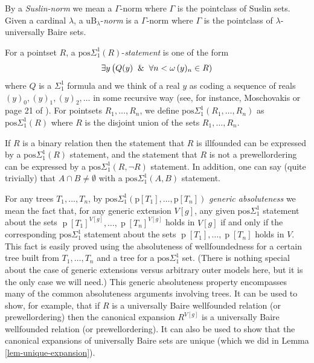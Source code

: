 \documentclass[fleqn, 11pt]{amsart}
\theoremstyle{plain}
\theoremstyle{definition}
\theoremstyle{remark}
\newcommand{\uB}{\mathrm{uB}}
\newcommand{\posSigmaoneone}{\mathrm{pos}\Sigma^1_1}
\DeclareMathOperator{\p}{p}
\begin{document}
By a \emph{Suslin-norm} we mean a $\Gamma$-norm where $\Gamma$ is the pointclass of Suslin sets. Given a cardinal $\lambda$, a $\uB_{\lambda}$-\emph{norm} is a $\Gamma$-norm where $\Gamma$ is the pointclass of $\lambda$-universally Baire sets.


For a pointset $R$, a $\posSigmaoneone(R)$-\emph{statement} 
is one of the form 
\[\exists y\,\big(Q(y) \And \forall n < \omega\, (y)_n \in R)\]
where $Q$ is a $\Sigma^1_1$ formula and we think of a real $y$ as coding a sequence of reals $(y)_0,(y)_1,(y)_2,\ldots$ in some recursive way (see, for instance, Moschovakis \cite[Lemma 7D.7]{MosDST2009} or page 21 of \cite{Larson:Extensions}).
For pointsets $R_1,\ldots,R_n$, we define $\posSigmaoneone(R_1,\ldots,R_n)$ as $\posSigmaoneone(R)$ where $R$ is the disjoint union of the sets $R_1,\ldots,R_n$.

If $R$ is a binary relation then the statement that $R$ is illfounded can be expressed by a $\posSigmaoneone(R)$ statement, and the statement that $R$ is not a prewellordering can be expressed by a  $\posSigmaoneone(R,\neg R)$ statement.
In addition, one can say (quite trivially) that $A \cap B \ne \emptyset$ with a $\posSigmaoneone(A,B)$ statement.

For any trees $T_1,\ldots,T_n$,
by $\posSigmaoneone(\text{p}[T_1],\ldots,\text{p}[T_n])$ \emph{generic absoluteness}
we mean the fact that, for any generic extension $V[g]$, any given $\posSigmaoneone$ statement about the sets $\p[T_1]^{V[g]},\ldots,\p[T_n]^{V[g]}$ holds in $V[g]$ if and only if the corresponding $\posSigmaoneone$ statement about the sets $\p[T_1],\ldots,\p[T_n]$ holds in $V$.  
This fact is easily proved using the absoluteness of wellfoundedness for a certain tree built from $T_1,\ldots,T_n$ and a tree for a $\posSigmaoneone$ set.  (There is nothing special about the case of generic extensions versus arbitrary outer models here, but it is the only case we will need.)
This generic absoluteness property encompasses many of the common absoluteness arguments involving trees.
It can be used to show, for example, that if $R$ is a universally Baire wellfounded relation (or prewellordering) then the canonical expansion $R^{V[g]}$ is a universally Baire wellfounded relation (or prewellordering).
It can also be used to show that the canonical expansions of universally Baire sets are unique (which we did in Lemma \ref{lem-unique-expansion}). 
\end{document}

